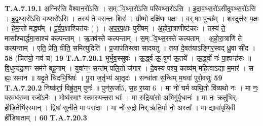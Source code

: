 \documentclass[17pt]{extarticle}
\begin{document}
                                \textbf{ T.A.7.19.1} \newline
                  अ॒ग्निर॑सि वैश्वान॒रो॑ऽसि । स॒म्ॅव॒थ्स॒रो॑ऽसि परिवथ्स॒रो॑ऽसि । इ॒दा॒व॒थ्स॒रो॑ऽसीदुवथ्स॒रो॑ऽसि । इ॒द्व॒थ्स॒रो॑ऽसि वथ्स॒रो॑ऽसि । तस्य॑ ते वस॒न्तः शिरः॑ । ग्री॒ष्मो दक्षि॑णः प॒क्षः । व॒र्॒.षाः पुच्छ᳚म् ।  श॒रदुत्त॑रः प॒क्षः । हे॒म॒न्तो मद्ध्य᳚म् । पू॒र्व॒प॒क्षाश्चित॑यः ( ) । अ॒प॒र॒प॒क्षाः पुरी॑षम् । अ॒हो॒रा॒त्राणीष्ट॑काः । तस्य॑ ते॒ मासा᳚श्चार्द्धमा॒साश्च॑ कल्पन्ताम् ।  ऋ॒तव॑स्ते कल्पन्ताम् । स॒म्ॅव॒थ्स॒रस्ते॑ कल्पताम् ।  अ॒हो॒रा॒त्राणि॑ ते कल्पन्ताम् । एति॒ प्रेति॒ वीति॒ समित्युदिति॑ ।  प्र॒जाप॑तिस्त्वा सादयतु । तया॑ दे॒वत॑याऽङ्गिर॒स्वद् ध्रु॒वा सी॑द । \textbf{ 58} \newline
                  \newline
                                                        (चित॑यो॒ नव॑ च) \textbf{19} \newline \newline
                                \textbf{ T.A.7.20.1} \newline
                  भूर्भुव॒स्सुवः॑ । ऊ॒र्द्ध्व ऊ॒ षुण॑ ऊ॒तये᳚ । ऊ॒र्द्ध्वो नः॑ पा॒ह्यꣳह॑सः ॥  वि॒धुन्द॑द्रा॒णꣳ सम॑ने बहू॒नाम् । युवा॑नꣳ॒॒ सन्त॑म् पलि॒तो ज॑गार । दे॒वस्य॑ पश्य॒ काव्य॑म् महि॒त्वाऽद्या म॒मार॑ । स ह्यः॒ समा॑न ॥  यदृ॒ते चि॑दभि॒श्रिषः॑ । पु॒रा ज॒र्तृभ्य॑ आ॒तृदः॑ ।  सन्धा॑ता स॒न्धिम् म॒घवा॑ पुरो॒वसुः॑ \textbf{ 59} \newline
                  \newline
                                                                  \textbf{ T.A.7.20.2} \newline
                  निष्क॑र्ता॒ विह्रु॑त॒म् पुनः॑ ॥ पुन॑रू॒र्जा{5}, स॒ह र॒य्या {6} । मा नो॑ घर्म व्यथि॒तो वि॑व्यथो नः । मा नः॒ पर॒मध॑र॒म्मा रजो॑ऽनैः । मोष्व॑स्माꣳ स्तम॑स्यन्त॒रा धाः᳚ । मा रु॒द्रिया॑सो अ॒भिगु॑र्वृ॒धानः॑ ॥ मा नः॒ क्रतु॑भिर्. हीडि॒तेभि॑र॒स्मान् । द्विषा॑ सुनीते॒ मा परा॑दाः ।  मा नो॑ रु॒द्रो निर्.ऋ॑ति॒र्मा नो॒ अस्ता᳚ ।  मा द्यावा॑पृथि॒वी ही॑डिषाताम् । \textbf{ 60} \newline
                  \newline
                                                                  \textbf{ T.A.7.20.3} \newline
\end{document}
